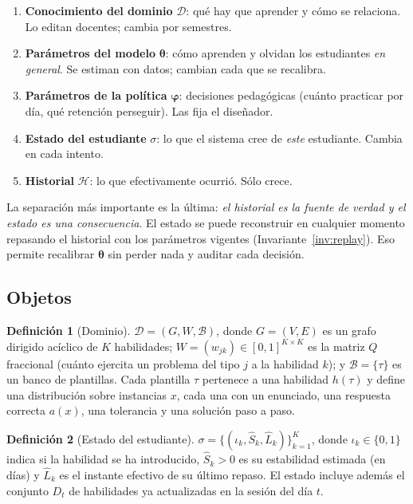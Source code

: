 \documentclass[11pt]{article}
\theoremstyle{definition}
\newtheorem{definicion}{Definición}
\theoremstyle{remark}
\newcommand{\Sh}{\hat S}
\newcommand{\Lh}{\hat L}
\newcommand{\Hist}{\mathcal H}
\newcommand{\Dom}{\mathcal D}
\newcommand{\Banco}{\mathcal B}
\begin{document}
\begin{enumerate}
\item \textbf{Conocimiento del dominio} $\Dom$: qué hay que aprender y cómo se relaciona. Lo editan docentes; cambia por semestres.
\item \textbf{Parámetros del modelo} $\bm\theta$: cómo aprenden y olvidan los estudiantes \emph{en general}. Se estiman con datos; cambian cada que se recalibra.
\item \textbf{Parámetros de la política} $\bm\varphi$: decisiones pedagógicas (cuánto practicar por día, qué retención perseguir). Las fija el diseñador.
\item \textbf{Estado del estudiante} $\sigma$: lo que el sistema cree de \emph{este} estudiante. Cambia en cada intento.
\item \textbf{Historial} $\Hist$: lo que efectivamente ocurrió. Sólo crece.
\end{enumerate}

La separación más importante es la última: \emph{el historial es la fuente de verdad y el estado es una consecuencia}. El estado se puede reconstruir en cualquier momento repasando el historial con los parámetros vigentes (Invariante~\ref{inv:replay}). Eso permite recalibrar $\bm\theta$ sin perder nada y auditar cada decisión.

\subsection{Objetos}

\begin{definicion}[Dominio]
$\Dom=(G,W,\Banco)$, donde $G=(V,E)$ es un grafo dirigido acíclico de $K$ habilidades; $W=(w_{jk})\in[0,1]^{K\times K}$ es la matriz $Q$ fraccional (cuánto ejercita un problema del tipo $j$ a la habilidad $k$); y $\Banco=\{\tau\}$ es un banco de plantillas. Cada plantilla $\tau$ pertenece a una habilidad $h(\tau)$ y define una distribución sobre instancias $x$, cada una con un enunciado, una respuesta correcta $a(x)$, una tolerancia y una solución paso a paso.
\end{definicion}

\begin{definicion}[Estado del estudiante]
$\sigma=\{(\iota_k,\Sh_k,\Lh_k)\}_{k=1}^K$, donde $\iota_k\in\{0,1\}$ indica si la habilidad se ha introducido, $\Sh_k>0$ es su estabilidad estimada (en días) y $\Lh_k$ es el instante efectivo de su último repaso. El estado incluye además el conjunto $D_t$ de habilidades ya actualizadas en la sesión del día $t$.
\end{definicion}
\end{document}
